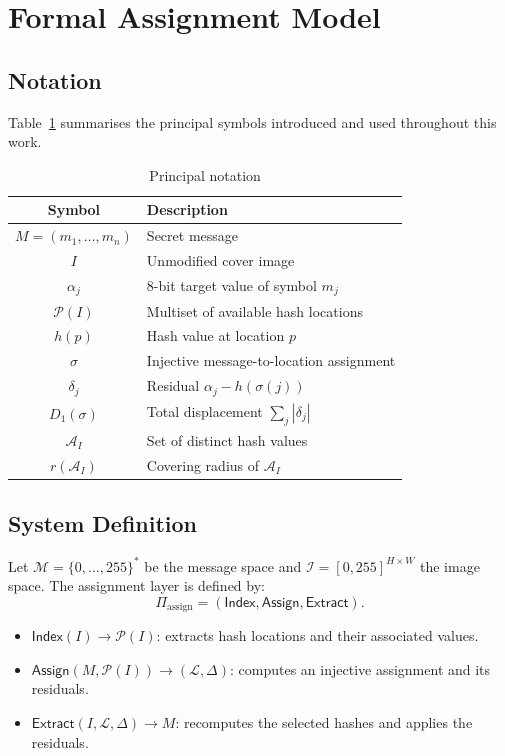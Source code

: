 \documentclass[preprint,12pt]{elsarticle}
\theoremstyle{plain}
\begin{document}
\section{Formal Assignment Model}
\label{sec:formal_model}

\subsection{Notation}
Table~\ref{tab:notation_valid} summarises the principal symbols introduced and used throughout this work.

\begin{table}[!t]
\centering
\caption{Principal notation}
\label{tab:notation_valid}
\begin{tabular}{c p{5.2cm}}
\toprule
\textbf{Symbol} & \textbf{Description} \\
\midrule
$M=(m_1,\ldots,m_n)$ & Secret message \\
$I$ & Unmodified cover image \\
$\alpha_j$ & 8-bit target value of symbol $m_j$ \\
$\mathcal{P}(I)$ & Multiset of available hash locations \\
$h(p)$ & Hash value at location $p$ \\
$\sigma$ & Injective message-to-location assignment \\
$\delta_j$ & Residual $\alpha_j-h(\sigma(j))$ \\
$D_1(\sigma)$ & Total displacement $\sum_j|\delta_j|$ \\
$\mathcal{A}_I$ & Set of distinct hash values \\
$r(\mathcal{A}_I)$ & Covering radius of $\mathcal{A}_I$ \\
\bottomrule
\end{tabular}
\end{table}

\subsection{System Definition}

Let $\mathcal{M} = \{0, \ldots, 255\}^*$ be the message space and
$\mathcal{I} = [0, 255]^{H \times W}$ the image space. The assignment layer is
defined by:
\[
    \Pi_{\mathrm{assign}} = (\mathsf{Index}, \mathsf{Assign}, \mathsf{Extract}).
\]

\begin{itemize}
    \item $\mathsf{Index}(I) \rightarrow \mathcal{P}(I)$: extracts hash locations and their associated values.
    \item $\mathsf{Assign}(M,\mathcal{P}(I)) \rightarrow (\mathcal{L},\Delta)$: computes an injective assignment and its residuals.
    \item $\mathsf{Extract}(I,\mathcal{L},\Delta) \rightarrow M$: recomputes the selected hashes and applies the residuals.
\end{itemize}
\end{document}
